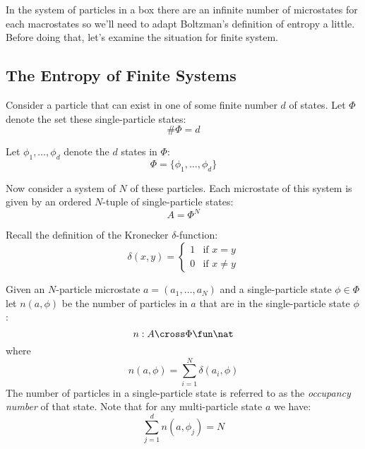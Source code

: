 \documentclass[11pt]{amsart}
\begin{document}
In the system of particles in a box there are an infinite number of microstates for each macrostates so we'll need to adapt Boltzman's definition of entropy a little.
Before doing that, let's examine the situation for finite system.

\subsection{The Entropy of Finite Systems}

Consider a particle that can exist in one of some finite number $d$ of states.
Let $\Phi$ denote the set these single-particle states:
\begin{equation}
	\# \Phi = d
\end{equation}

Let $\phi_1, \ldots, \phi_d$ denote the $d$ states in $\Phi$:
\begin{equation}
	\Phi = \{ \phi_1, \ldots, \phi_d \}
\end{equation}


Now consider a system of $N$ of these particles.
Each microstate of this system is given by an ordered $N$-tuple of single-particle states:
\begin{equation}
	A = \Phi^N
\end{equation}

Recall the definition of the Kronecker $\delta$-function:
\begin{equation}
	\delta(x,y) = 
		\left\{
			\begin{array}{ll}
			1	&	\mbox{if $x = y$} \\
			0	&	\mbox{if $x \neq y$}
			\end{array}
		 \right.
\end{equation}

Given an $N$-particle microstate $a = (a_1, \ldots, a_N)$  and a single-particle state $\phi \in \Phi$ let $n(a, \phi)$ be the number of particles in
$a$ that are in the single-particle state $\phi$:
\begin{equation}
	n : A  \cross \Phi \fun \nat
\end{equation}
where
\begin{equation}
	n(a, \phi) = \sum_{i=1}^N \delta(a_i, \phi)
\end{equation}
The number of particles in a single-particle state is referred to as the {\it occupancy number} of that state.
Note that for any multi-particle state $a$ we have:
\begin{equation}
	\sum_{j=1}^d n(a, \phi_j) = N
\end{equation}
\end{document}
